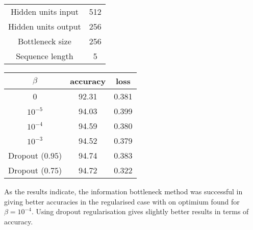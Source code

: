 \documentclass[11pt,oneside,openright]{report}
\begin{document}
\begin{minipage}{0.5\textwidth}
        \centering
\begin{tabular}{ c | c  }
 Hidden units input & 512 \\
 Hidden units output & 256 \\
 Bottleneck size & 256 \\
 Sequence length & 5 \\
\end{tabular}
    \end{minipage}\hfill
    \begin{minipage}{0.5\textwidth}
        \centering
\begin{tabular}{ c | c c }
 $\beta$ & accuracy & loss \\
 \hline
0  & 92.31 & 0.381 \\
$10^{-5}$  & 94.03 & 0.399 \\
$10^{-4}$  & 94.59 & 0.380 \\
$10^{-3}$  & 94.52 & 0.379 \\
\hline
\hline
Dropout ($0.95$) & 94.74 & 0.383\\
Dropout ($0.75$) & 94.72 & 0.322
\end{tabular}
    \end{minipage}

\begin{center}
\end{center}

As the results indicate, the information bottleneck method was successful in giving better accuracies in the regularised case with on optimium found for $\beta = 10^{-4}$. Using dropout regularisation gives slightly better results in terms of accuracy.
\end{document}
